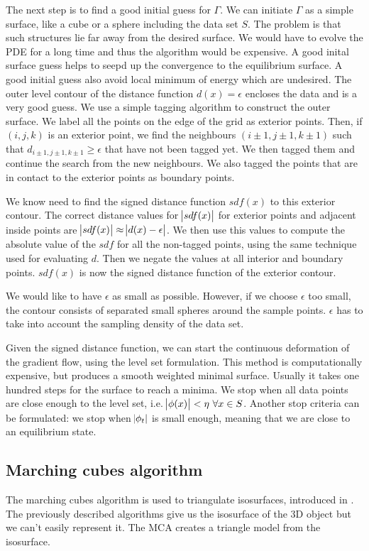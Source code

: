 \documentclass[12pt]{article}
\begin{document}
The next step is to find a good initial guess for $\Gamma$. We can initiate $\Gamma$ as a simple surface, like a cube or a sphere including the data set $S$. The problem is that such structures lie far away from the desired surface. We would have to evolve the PDE for a long time and thus the algorithm would be expensive. A good inital surface guess helps to seepd up the convergence to the equilibrium surface. A good initial guess also avoid local minimum of energy which are undesired. The outer level contour of the distance function $d(x) = \epsilon$ encloses the data and is a very good guess. We use a simple tagging algorithm to construct the outer surface. We label all the points on the edge of the grid as exterior points. Then, if $(i,j,k)$ is an exterior point, we find the neighbours $(i\pm 1,j\pm 1,k\pm 1)$ such that $d_{i\pm 1,j\pm 1,k\pm 1} \geq \epsilon$ that have not been tagged yet. We then tagged them and continue the search from the new neighbours. We also tagged the points that are in contact to the exterior points as boundary points.

We know need to find the signed distance function $sdf(x)$ to this exterior contour. The correct distance values for $\abs{sdf(x)}$ for exterior points and adjacent inside points are $\abs{sdf(x)} \approx \abs{d(x) - \epsilon}$. We then use this values to compute the absolute value of the $sdf$ for all the non-tagged points, using the same technique used for evaluating $d$. Then we negate the values at all interior and boundary points. $sdf(x)$ is now the signed distance function of the exterior contour.

We would like to have $\epsilon$ as small as possible. However, if we choose $\epsilon$ too small, the contour consists of separated small spheres around the sample points. $\epsilon$ has to take into account the sampling density of the data set.

Given the signed distance function, we can start the continuous deformation of the gradient flow, using the level set formulation. This method is computationally expensive, but produces a smooth weighted minimal surface. Usually it takes one hundred steps for the surface to reach a minima. We stop when all data points are close enough to the level set, i.e. $\abs{\phi(x)} < \eta\text{ }\forall x\in S$. Another stop criteria can be formulated: we stop when $\abs{\phi_t}$ is small enough, meaning that we are close to an equilibrium state.

\subsection{Marching cubes algorithm}
\label{subsec:mca}
The marching cubes algorithm is used to triangulate isosurfaces, introduced in \cite{MCA}. The previously described algorithms give us the isosurface of the 3D object but we can't easily represent it. The MCA creates a triangle model from the isosurface.
\end{document}
